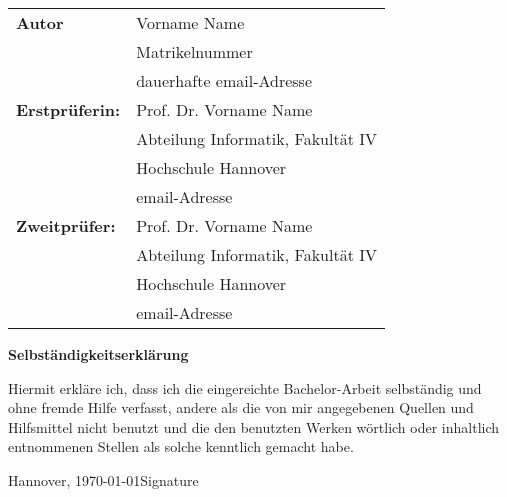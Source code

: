 \thispagestyle{empty}
\begin{tabular}{ll}
  {\bfseries\sffamily Autor}         & Vorname Name                      \\
                                     & Matrikelnummer                    \\
                                     & dauerhafte email-Adresse          \\[5ex]
  {\bfseries\sffamily Erstprüferin:} & Prof. Dr. Vorname Name            \\
                                     & Abteilung Informatik, Fakultät IV \\
                                     & Hochschule Hannover               \\
                                     & email-Adresse                     \\[5ex]
  {\bfseries\sffamily Zweitprüfer:}  & Prof. Dr. Vorname Name            \\
                                     & Abteilung Informatik, Fakultät IV \\
                                     & Hochschule Hannover               \\
                                     & email-Adresse
\end{tabular}

\vfill

\begin{center} \sffamily\bfseries Selbständigkeitserklärung \end{center}

Hiermit erkläre ich, dass ich die eingereichte Bachelor-Arbeit
selbständig und ohne fremde Hilfe verfasst, andere als die von mir angegebenen Quellen
und Hilfsmittel nicht benutzt und die den benutzten Werken wörtlich oder
inhaltlich entnommenen Stellen als solche kenntlich gemacht habe.
\vspace*{7ex}

Hannover, \today \hfill Signature
\newpage